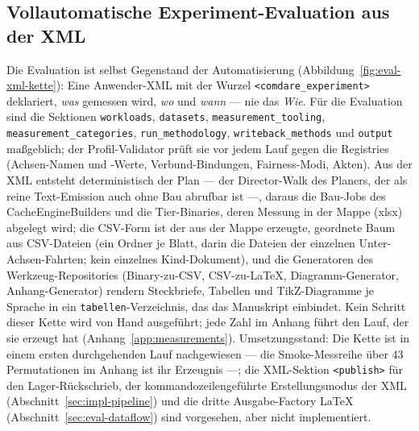 \begin{nurlang}
\subsection{Vollautomatische Experiment-Evaluation aus der XML}\label{sec:eval-xml}
Die Evaluation ist selbst Gegenstand der Automatisierung (Abbildung~\ref{fig:eval-xml-kette}): Eine
Anwender-XML mit der Wurzel \texttt{<comdare\_experiment>} deklariert, \emph{was} gemessen wird,
\emph{wo} und \emph{wann} --- nie das \emph{Wie}. Für die Evaluation sind die Sektionen
\texttt{workloads}, \texttt{datasets}, \texttt{measurement\_tooling}, \texttt{measurement\_categories},
\texttt{run\_methodology}, \texttt{writeback\_methods} und \texttt{output} maßgeblich; der Profil-Validator prüft
sie vor jedem Lauf gegen die Registries (Achsen-Namen und -Werte, Verbund-Bindungen, Fairness-Modi,
Akten). Aus der XML entsteht deterministisch der Plan --- der Director-Walk des Planers, der als reine
Text-Emission auch ohne Bau abrufbar ist ---, daraus die Bau-Jobs des CacheEngineBuilders und die
Tier-Binaries, deren Messung in der Mappe (xlsx) abgelegt wird; die CSV-Form ist der aus der Mappe erzeugte,
geordnete Baum aus CSV-Dateien (ein Ordner je Blatt, darin die Dateien der einzelnen Unter-Achsen-Fahrten;
kein einzelnes Kind-Dokument), und die
Generatoren des Werkzeug-Repositories (Binary-zu-CSV, CSV-zu-LaTeX, Diagramm-Generator,
Anhang-Generator) rendern Steckbriefe, Tabellen und TikZ-Diagramme je Sprache in ein
\texttt{tabellen}-Verzeichnis, das das Manuskript einbindet. Kein Schritt dieser Kette wird von Hand
ausgeführt; jede Zahl im Anhang führt den Lauf, der sie erzeugt hat (Anhang~\ref{app:measurements}).
Umsetzungsstand: Die Kette ist in einem ersten durchgehenden Lauf nachgewiesen --- die Smoke-Messreihe über 43
Permutationen im Anhang ist ihr Erzeugnis ---; die XML-Sektion \texttt{<publish>} für den
Lager-Rückschrieb, der kommandozeilengeführte Erstellungsmodus der XML
(Abschnitt~\ref{sec:impl-pipeline}) und die dritte Ausgabe-Factory LaTeX
(Abschnitt~\ref{sec:eval-dataflow}) sind vorgesehen, aber nicht implementiert.
\begin{figure}[htbp]\centering
\end{figure}
\end{nurlang}
